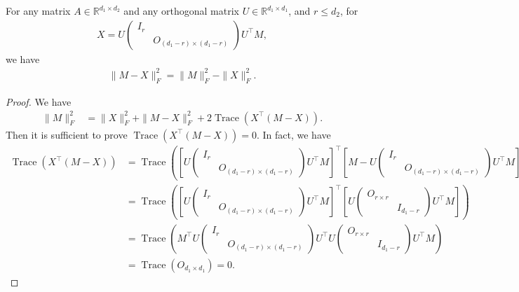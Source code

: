 \begin{lemma}
    \label{lossineq}
    For any matrix $A\in\mathbb{R}^{d_1\times d_2}$ and any orthogonal matrix $U\in\mathbb{R}^{d_1\times d_1}$, and $r\leq d_2$, for
    \begin{align}
        X=U\begin{pmatrix}
            I_r\\&O_{(d_1-r)\times (d_1-r)}
        \end{pmatrix}U^\top M,
    \end{align}
    we have
    \begin{align}
        \|M-X\|_F^2=\|M\|_F^2-\|X\|_F^2.
    \end{align}
\end{lemma}
\begin{proof}
    We have
    \begin{align}
        \|M\|_F^2&=\|X\|_F^2+\|M-X\|_F^2+2\operatorname{Trace}(X^\top(M-X)).
    \end{align}
    Then it is sufficient to prove $\operatorname{Trace}(X^\top(M-X))=0$. In fact, we have
    \begin{align}
        \operatorname{Trace}\left(X^\top(M-X)\right)
        &=\operatorname{Trace}\left(\left[U\begin{pmatrix}
            I_r\\&O_{(d_1-r)\times (d_1-r)}
        \end{pmatrix}U^\top M\right]^\top\left[M-U\begin{pmatrix}
            I_r\\&O_{(d_1-r)\times (d_1-r)}
        \end{pmatrix}U^\top M\right]\right)\\
        &=\operatorname{Trace}\left(\left[U\begin{pmatrix}
            I_r\\&O_{(d_1-r)\times (d_1-r)}
        \end{pmatrix}U^\top M\right]^\top\left[U\begin{pmatrix}
            O_{r\times r}\\&I_{d_1-r}
        \end{pmatrix}U^\top M\right]\right)\\
        &=\operatorname{Trace}\left(M^\top U\begin{pmatrix}
            I_r\\&O_{(d_1-r)\times (d_1-r)}
        \end{pmatrix}U^\top U\begin{pmatrix}
            O_{r\times r}\\&I_{d_1-r}
        \end{pmatrix}U^\top M\right)\\
        &=\operatorname{Trace}(O_{d_1\times d_1})=0.
    \end{align}
\end{proof}
